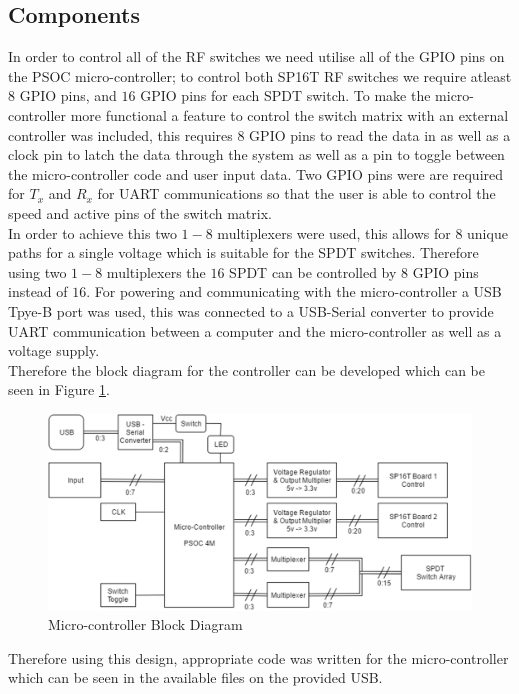 \documentclass[12pt,openany,a4paper]{book}
\begin{document}
\subsection{Components}	\label{sec:micro-components}
In order to control all of the RF switches we need utilise all of the GPIO pins on the PSOC micro-controller; to control both SP16T RF switches we require atleast $8$ GPIO pins, and $16$ GPIO pins for each SPDT switch. To make the micro-controller more functional a feature to control the switch matrix with an external controller was included, this requires $8$ GPIO pins to read the data in as well as a clock pin to latch the data through the system as well as a pin to toggle between the micro-controller code and user input data. Two GPIO pins were are required for $T_x$ and $R_x$ for UART communications so that the user is able to control the speed and active pins of the switch matrix.\\[0.2cm] 
In order to achieve this two $1-8$ multiplexers were used, this allows for $8$ unique paths for a single voltage which is suitable for the SPDT switches. Therefore using two $1-8$ multiplexers the $16$ SPDT can be controlled by $8$ GPIO pins instead of $16$. For powering and communicating with the micro-controller a USB Tpye-B port was used, this was connected to a USB-Serial converter to provide UART communication between a computer and the micro-controller as well as a voltage supply.\\[0.2cm]
Therefore the block diagram for the controller can be developed which can be seen in Figure \ref{fig:micro-block}.
\begin{figure}[H]
	\centering
	\includegraphics[width=1\textwidth]{microcontroller-block.png}
	\caption{Micro-controller Block Diagram}
	\label{fig:micro-block}
\end{figure} 
Therefore using this design, appropriate code was written for the micro-controller which can be seen in the available files on the provided USB. 
\end{document}
